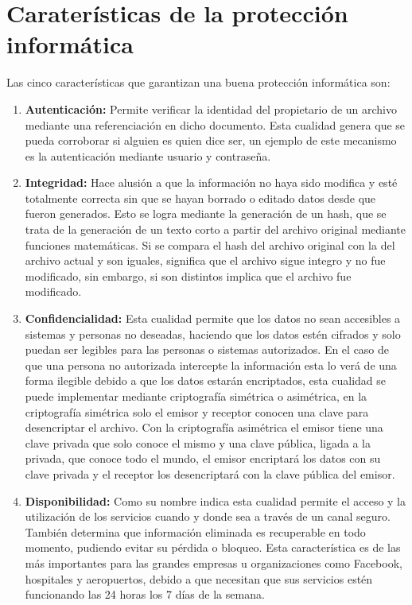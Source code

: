\section{Caraterísticas de la protección informática}
Las cinco características que garantizan una buena protección informática son:
\begin{enumerate}
\item {\bfseries Autenticación:}
Permite verificar la identidad del propietario de un archivo mediante una referenciación en dicho documento. Esta cualidad genera que se pueda corroborar si alguien es quien dice ser, un ejemplo de este mecanismo es la autenticación mediante usuario y contraseña.
\item {\bfseries Integridad:}
Hace alusión a que la información no haya sido modifica y esté totalmente correcta sin que se hayan borrado o editado datos desde que fueron generados. Esto se logra mediante la generación de un hash, que se trata de la generación de un texto corto a partir del archivo original mediante funciones matemáticas. Si se compara el hash del archivo original con la del archivo actual y son iguales, significa que el archivo sigue integro y no fue modificado, sin embargo, si son distintos implica que el archivo fue modificado.
\item {\bfseries Confidencialidad:}
Esta cualidad permite que los datos no sean accesibles a sistemas y personas no deseadas, haciendo que los datos estén cifrados y solo puedan ser legibles para las personas o sistemas autorizados. En el caso de que una persona no autorizada intercepte la información esta lo verá de una forma ilegible debido a que los datos estarán encriptados, esta cualidad se puede implementar mediante criptografía simétrica o asimétrica, en la criptografía simétrica solo el emisor y receptor conocen una clave para desencriptar el archivo. Con la criptografía asimétrica el emisor tiene una clave privada que solo conoce el mismo y una clave pública, ligada a la privada, que conoce todo el mundo, el emisor encriptará los datos con su clave privada y el receptor los desencriptará con la clave pública del emisor.
\item {\bfseries Disponibilidad:}
Como su nombre indica esta cualidad permite el acceso y la utilización de los servicios cuando y donde sea a través de un canal seguro. También determina que información eliminada es recuperable en todo momento, pudiendo evitar su pérdida o bloqueo. Esta característica es de las más importantes para las grandes empresas u organizaciones como Facebook, hospitales y aeropuertos, debido a que necesitan que sus servicios estén funcionando las 24 horas los 7 días de la semana.

\end{enumerate}
